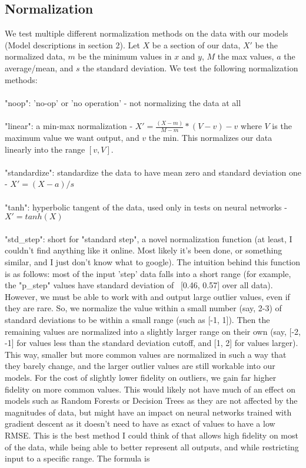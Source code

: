 \documentclass{article}
\begin{document}
\subsection{Normalization}

We test multiple different normalization methods on the data with our models (Model descriptions in section 2). Let $X$ be a section of our data, $X'$ be the normalized data, $m$ be the minimum values in $x$ and $y$, $M$ the max values, $a$ the average/mean, and $s$ the standard deviation. We test the following normalization methods:\\\\

"noop": 'no-op' or 'no operation' - not normalizing the data at all\\\\
"linear": a min-max normalization - $X' = \frac{(X - m)}{M-m} * (V-v) - v$ where $V$ is the maximum value we want output, and $v$ the min. This normalizes our data linearly into the range $[v, V]$.\\\\
"standardize": standardize the data to have mean zero and standard deviation one - $X' = (X - a) / s$\\\\
"tanh": hyperbolic tangent of the data, used only in tests on neural networks - $X' = tanh(X)$\\\\
"std\_step": short for "standard step", a novel normalization function (at least, I couldn't find anything like it online. Most likely it's been done, or something similar, and I just don't know what to google). The intuition behind this function is as follows: most of the input 'step' data falls into a short range (for example, the "p\_step" values have standard deviation of ~[0.46, 0.57] over all data). However, we must be able to work with and output large outlier values, even if they are rare. So, we normalize the value within a small number (say, 2-3) of standard deviations to be within a small range (such as [-1, 1]). Then the remaining values are normalized into a slightly larger range on their own (say, [-2, -1] for values less than the standard deviation cutoff, and [1, 2] for values larger). This way, smaller but more common values are normalized in such a way that they barely change, and the larger outlier values are still workable into our models. For the cost of slightly lower fidelity on outliers, we gain far higher fidelity on more common values. This would likely not have much of an effect on models such as Random Forests or Decision Trees as they are not affected by the magnitudes of data, but might have an impact on neural networks trained with gradient descent as it doesn't need to have as exact of values to have a low RMSE. This is the best method I could think of that allows high fidelity on most of the data, while being able to better represent all outputs, and while restricting input to a specific range. The formula is
\end{document}
